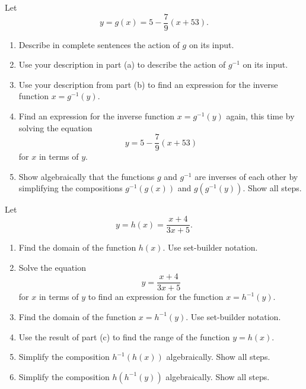 \documentclass{ximera}
\begin{document}
\begin{question}  \label{Qre345rrree}
Let
\[
   y = g(x) = 5 - \frac{7}{9} \left( x + 53 \right) . 
\] 

\begin{enumerate}

\item Describe in complete sentences the action of $g$ on its input.

\item Use your description in part (a) to describe the action of $g^{-1}$ on its input.

\item Use your description from part (b) to find an expression for the inverse function $x = g^{-1}(y)$.

\item Find an expression for the inverse function $x= g^{-1}(y)$ again, this time by solving the equation
\[
   y = 5 - \frac{7}{9} \left( x + 53 \right)
\]
for $x$ in terms of $y$. 

\item Show algebraically that the functions $g$ and $g^{-1}$ are inverses of each other by simplifying the compositions $g^{-1}(g(x))$ and $g(g^{-1}(y))$. Show all steps.

\end{enumerate}
\end{question}


\begin{question} \label{Exdfl3rr3980}
Let
\[
    y =  h(x) = \frac{x+4}{3x+5} .
\]

\begin{enumerate}
\item Find the domain of the function $h(x)$. Use set-builder notation.

\item Solve the equation 
\[
       y = \frac{x+4}{3x+5}
\]
for $x$ in terms of $y$ to find an expression for the function $x = h^{-1}(y)$.

\item Find the domain of the function $x = h^{-1}(y)$. Use set-builder notation.

\item Use the result of part (c) to find the range of the function $y = h(x)$. 

\item Simplify the composition $h^{-1}(h(x))$ algebraically. Show all steps.

\item Simplify the composition $h(h^{-1}(y))$ algebraically. Show all steps.

\end{enumerate}
\end{question}
\end{document}

